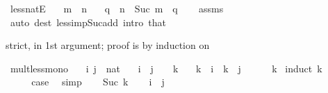 \begin{isabellebody}
\isamarkupfalse%
\ less{\isacharunderscore}{\kern0pt}natE{\isacharcolon}{\kern0pt}\isanewline
\ \ \ {\isacartoucheopen}m\ {\isacharless}{\kern0pt}\ n{\isacartoucheclose}\isanewline
\ \ \ q\ \ {\isacartoucheopen}n\ {\isacharequal}{\kern0pt}\ Suc\ {\isacharparenleft}{\kern0pt}m\ {\isacharplus}{\kern0pt}\ q{\isacharparenright}{\kern0pt}{\isacartoucheclose}\isanewline
%
\isadelimproof
\ \ %
\endisadelimproof
%
\isatagproof
{}\isamarkupfalse%
\ assms\ \isamarkupfalse%
\ {\isacharparenleft}{\kern0pt}auto\ dest{\isacharcolon}{\kern0pt}\ less{\isacharunderscore}{\kern0pt}imp{\isacharunderscore}{\kern0pt}Suc{\isacharunderscore}{\kern0pt}add\ intro{\isacharcolon}{\kern0pt}\ that{\isacharparenright}{\kern0pt}%
\endisatagproof
{\isafoldproof}%
%
\isadelimproof
%
\endisadelimproof
%
\begin{isamarkuptext}%
strict, in 1st argument; proof is by induction on %
\end{isamarkuptext}\isamarkuptrue%
\isamarkupfalse%
\ mult{\isacharunderscore}{\kern0pt}less{\isacharunderscore}{\kern0pt}mono{}{\isacharcolon}{\kern0pt}\isanewline
\ \ \ i\ j\ {\isacharcolon}{\kern0pt}{\isacharcolon}{\kern0pt}\ nat\isanewline
\ \ \ {\isachardoublequoteopen}i\ {\isacharless}{\kern0pt}\ j{\isachardoublequoteclose}\ \ {\isachardoublequoteopen}{}\ {\isacharless}{\kern0pt}\ k{\isachardoublequoteclose}\isanewline
\ \ \ {\isachardoublequoteopen}k\ {\isacharasterisk}{\kern0pt}\ i\ {\isacharless}{\kern0pt}\ k\ {\isacharasterisk}{\kern0pt}\ j{\isachardoublequoteclose}\isanewline
%
\isadelimproof
\ \ %
\endisadelimproof
%
\isatagproof
{}\isamarkupfalse%
\ {\isacartoucheopen}{}\ {\isacharless}{\kern0pt}\ k{\isacartoucheclose}\isanewline
{}\isamarkupfalse%
\ {\isacharparenleft}{\kern0pt}induct\ k{\isacharparenright}{\kern0pt}\isanewline
\ \ \isamarkupfalse%
\ {}\isanewline
\ \ \isamarkupfalse%
\ \isamarkupfalse%
\ {\isacharquery}{\kern0pt}case\ \isamarkupfalse%
\ simp\isanewline
{}\isamarkupfalse%
\isanewline
\ \ \isamarkupfalse%
\ {\isacharparenleft}{\kern0pt}Suc\ k{\isacharparenright}{\kern0pt}\isanewline
\ \ \isamarkupfalse%
\ {\isacartoucheopen}i\ {\isacharless}{\kern0pt}\ j{\isacartoucheclose}\ \isamarkupfalse%

\end{isabellebody}
